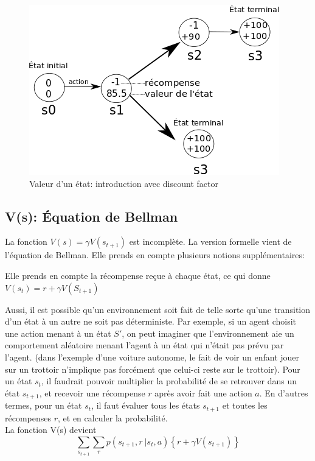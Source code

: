 \documentclass[11pt,a4paper]{report}
\begin{document}
    \begin{figure}[!h]
    \center
    \includegraphics[scale=0.60]{ressources/introduction_function_value_4.png}
    \caption{Valeur d'un état: introduction avec discount factor}
    \end{figure} 
    
  \subsection{V(s): Équation de Bellman}
  
    \par La fonction $V(s) = \gamma V(s_{t+1})$ est incomplète. La version formelle vient de l'équation de Bellman. Elle prends en compte plusieurs notions  supplémentaires: 
    
    \par Elle prends en compte la récompense reçue à chaque état, ce qui donne \\ $V(s_t) = r + \gamma V(S_{t+1})$
    
    \par Aussi, il est possible qu'un environnement soit fait de telle sorte qu'une transition d'un état à un autre ne soit pas déterministe. Par exemple, si un agent choisit une action menant à un état $S'$, on peut imaginer que l'environnement aie un comportement aléatoire menant l'agent à un état qui n'était pas prévu par l'agent. (dans l'exemple d'une voiture autonome, le fait de voir un enfant jouer sur un trottoir n'implique pas forcément que celui-ci reste sur le trottoir). Pour un état $s_t$, il faudrait pouvoir multiplier la probabilité de se retrouver dans un état $s_{t+1}$, et recevoir une récompense $r$ après avoir fait une action $a$. En d'autres termes, pour un état $s_t$, il faut évaluer tous les états $s_{t+1}$ et toutes les récompenses $r$, et en calculer la probabilité. \\
    La fonction V(s) devient $$\sum_{s_{t+1}}\sum_rp(s_{t+1},r\ |s_t,a)\left\{r+\gamma V(s_{t+1})\right\}$$
    
\end{document}

